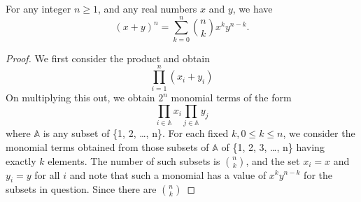 \documentclass[11pt]{article}
\begin{document}
\begin{theorem}
    For any integer \(n \geqslant 1\), and any real numbers \(x\) and \(y\), we have
    \[
        (x + y)^n = \sum_{k = 0}^{n} \binom{n}{k} x^k y^{n - k}.
    \]
\end{theorem}
\begin{proof}
    We first consider the product and obtain
    \[\prod_{ i = 1}^{n} (x_i + y_i)\]
    On multiplying this out, we obtain \(2^n\) monomial terms of the form
    \[
        \prod_{i \in \mathbb{A}} x_i \prod_{j \in \mathbb{A}} y_j
    \]
    where \(\mathbb{A}\) is any subset of \{1, 2, \ldots, n\}. For each fixed \(k, 0 \leqslant k \leqslant n\), we consider the monomial terms obtained from those subsets of \(\mathbb{A}\) of \{1, 2, 3, \ldots, n\} having exactly \(k\) elements. The number of such subsets is \(\binom{n}{k}\), and the set \(x_i = x\) and \(y_i = y\) for all \(i\) and note that such a monomial has a value of \(x^k y^{n - k}\) for the subsets in question. Since there are \(\binom{n}{k}\)
\end{proof}
\end{document}
